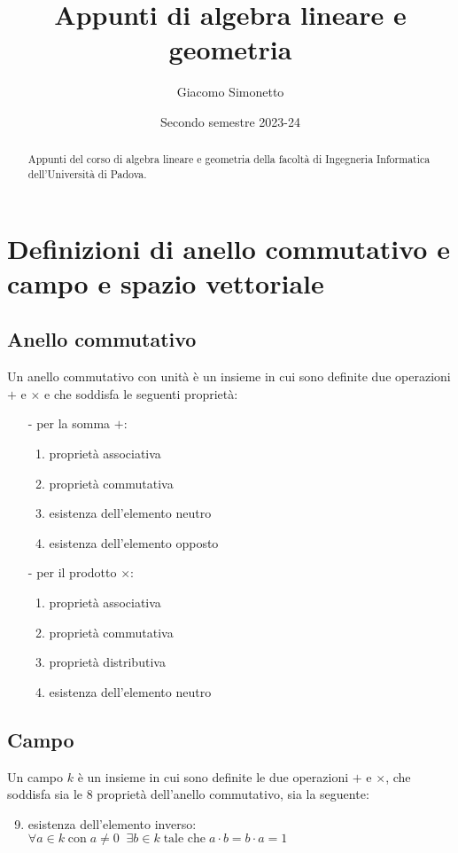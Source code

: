 \documentclass[a4paper]{article}
\title{Appunti di algebra lineare e geometria}
\author{Giacomo Simonetto}
\date{Secondo semestre 2023-24}
\begin{document}
\maketitle
\begin{abstract}
	Appunti del corso di algebra lineare e geometria della facoltà di Ingegneria Informatica dell'Università di Padova.
\end{abstract}

\newpage

\tableofcontents

\newpage

\section{Definizioni  di anello commutativo e campo e spazio vettoriale}
\subsection{Anello commutativo}
Un anello commutativo con unità è un insieme in cui sono definite due operazioni \(+\) e \(\times\) e che soddisfa le seguenti
proprietà:
\begin{itemize}
	\item[-] per la somma \(+\):
	\begin{enumerate}
		\item proprietà associativa
		\item proprietà commutativa
		\item esistenza dell'elemento neutro
		\item esistenza dell'elemento opposto
	\end{enumerate}
	\item[-] per il prodotto \(\times\):
	\begin{enumerate}[resume]
		\item proprietà associativa
		\item proprietà commutativa
		\item proprietà distributiva
		\item esistenza dell'elemento neutro
	\end{enumerate}
\end{itemize}

\subsection{Campo}
Un campo \(k\) è un insieme in cui sono definite le due operazioni \(+\) e \(\times\), che soddisfa sia le 8 proprietà dell'anello
commutativo, sia la seguente:
\begin{enumerate}[topsep=3pt, itemsep=0pt] \setcounter{enumi}{8}
	\item esistenza dell'elemento inverso: \(\forall a \in k \; \text{con} \; a \neq 0 \;\; \exists b \in k \; \text{tale che} \; a \cdot b =  b \cdot a = 1\)
\end{enumerate}
\end{document}
